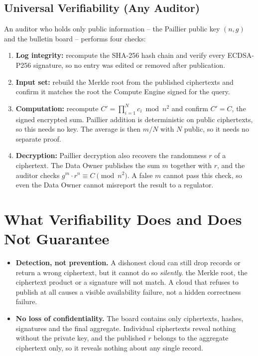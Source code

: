 \documentclass[12pt]{article}
\begin{document}
\subsection{Universal Verifiability (Any Auditor)}
An auditor who holds only public information -- the Paillier public key $(n, g)$ and the bulletin board -- performs four checks:
\begin{enumerate}[leftmargin=1.5em]
    \item \textbf{Log integrity:} recompute the SHA-256 hash chain and verify every ECDSA-P256 signature, so no entry was edited or removed after publication.
    \item \textbf{Input set:} rebuild the Merkle root from the published ciphertexts and confirm it matches the root the Compute Engine signed for the query.
    \item \textbf{Computation:} recompute $C' = \prod_{i=1}^{N} c_i \bmod n^2$ and confirm $C' = C$, the signed encrypted sum. Paillier addition is deterministic on public ciphertexts, so this needs no key. The average is then $m / N$ with $N$ public, so it needs no separate proof.
    \item \textbf{Decryption:} Paillier decryption also recovers the randomness $r$ of a ciphertext. The Data Owner publishes the sum $m$ together with $r$, and the auditor checks $g^{m} \cdot r^{n} \equiv C \pmod{n^2}$. A false $m$ cannot pass this check, so even the Data Owner cannot misreport the result to a regulator.
\end{enumerate}

\section{What Verifiability Does and Does Not Guarantee}
\begin{itemize}[leftmargin=1.5em]
    \item \textbf{Detection, not prevention.} A dishonest cloud can still drop records or return a wrong ciphertext, but it cannot do so \emph{silently}. the Merkle root, the ciphertext product or a signature will not match. A cloud that refuses to publish at all causes a visible availability failure, not a hidden correctness failure.
    \item \textbf{No loss of confidentiality.} The board contains only ciphertexts, hashes, signatures and the final aggregate. Individual ciphertexts reveal nothing without the private key, and the published $r$ belongs to the aggregate ciphertext only, so it reveals nothing about any single record.
\end{itemize}
\end{document}
